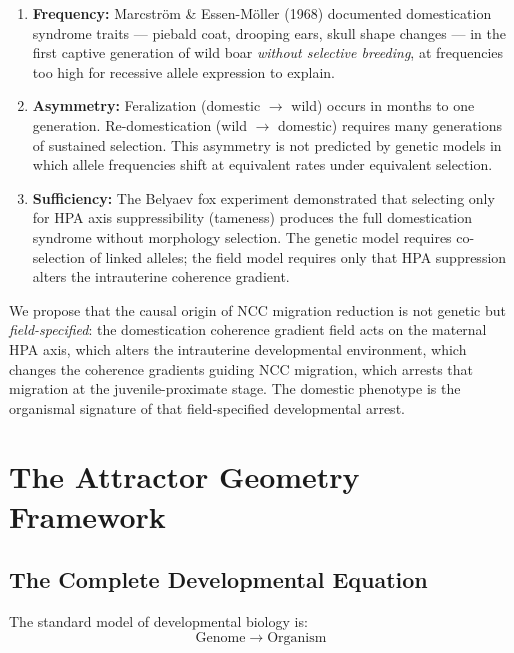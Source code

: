\documentclass[11pt, a4paper]{article}
\begin{document}
\begin{enumerate}[itemsep=0.2em]
  \item \textbf{Frequency:} Marcstr\"{o}m \&
  Essen-M\"{o}ller (1968) documented domestication
  syndrome traits --- piebald coat, drooping ears,
  skull shape changes --- in the first captive generation
  of wild boar \textit{without selective breeding},
  at frequencies too high for recessive allele expression
  to explain.

  \item \textbf{Asymmetry:} Feralization (domestic
  $\rightarrow$ wild) occurs in months to one generation.
  Re-domestication (wild $\rightarrow$ domestic) requires
  many generations of sustained selection. This asymmetry
  is not predicted by genetic models in which allele
  frequencies shift at equivalent rates under equivalent
  selection.

  \item \textbf{Sufficiency:} The Belyaev fox experiment
  \cite{belyaev1979} demonstrated that selecting only for
  HPA axis suppressibility (tameness) produces the full
  domestication syndrome without morphology selection.
  The genetic model requires co-selection of linked
  alleles; the field model requires only that HPA
  suppression alters the intrauterine coherence gradient.
\end{enumerate}

We propose that the causal origin of NCC migration
reduction is not genetic but \textit{field-specified}:
the domestication coherence gradient field acts on the
maternal HPA axis, which alters the intrauterine
developmental environment, which changes the coherence
gradients guiding NCC migration, which arrests that
migration at the juvenile-proximate stage. The domestic
phenotype is the organismal signature of that
field-specified developmental arrest.

\section{The Attractor Geometry Framework}
\label{sec:framework}

\subsection{The Complete Developmental Equation}

The standard model of developmental biology is:
\[
  \text{Genome} \;\rightarrow\; \text{Organism}
\]
\end{document}
